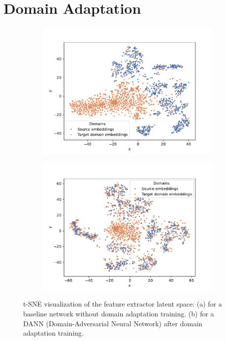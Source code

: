 \chapter{Domain Adaptation}
\graphicspath{{figs/2c/}}
\begin{figure}[H]
    \centering
    \begin{subfigure}{.5\textwidth}
        \centering
        \includegraphics[width=\linewidth]{t-SNE_without_domain_adaptation.pdf}
        \caption{}
        \label{fig:t-SNE:without}
    \end{subfigure}%
    \begin{subfigure}{.5\textwidth}
        \centering
        \includegraphics[width=\linewidth]{t-SNE_with_domain_adaptation.pdf}
        \caption{}
        \label{fig:t-SNE:with}
    \end{subfigure}
    \caption{t-SNE visualization of the feature extractor latent space: (a) for a baseline network without domain adaptation training. (b) for a DANN (Domain-Adversarial Neural Network) after domain adaptation training.}
    \label{fig:t-SNE}
\end{figure}

